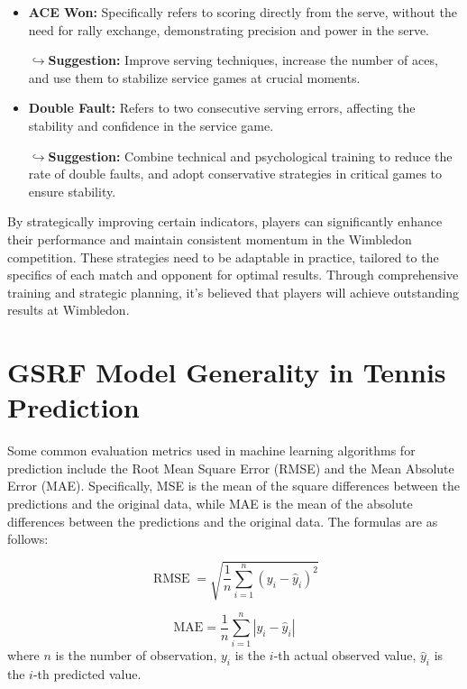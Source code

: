\documentclass[12pt]{article}%
\begin{document}
\begin{itemize}
	\item \textbf{ACE Won:} Specifically refers to scoring directly from the serve, without the need for rally exchange, demonstrating precision and power in the serve.
	
	\textbf{$\hookrightarrow$Suggestion:} Improve serving techniques, increase the number of aces, and use them to stabilize service games at crucial moments.
	
	\item \textbf{Double Fault:}  Refers to two consecutive serving errors, affecting the stability and confidence in the service game.
	
	\textbf{$\hookrightarrow$Suggestion:} Combine technical and psychological training to reduce the rate of double faults, and adopt conservative strategies in critical games to ensure stability.
	
\end{itemize}


By strategically improving certain indicators, players can significantly enhance their performance and maintain consistent momentum in the Wimbledon competition. These strategies need to be adaptable in practice, tailored to the specifics of each match and opponent for optimal results. Through comprehensive training and strategic planning, it's believed that players will achieve outstanding results at Wimbledon.



\section{GSRF Model Generality in Tennis Prediction}
Some common evaluation metrics used in machine learning algorithms for prediction include the Root Mean Square Error (RMSE) and the Mean Absolute Error (MAE). Specifically, MSE is the mean of the square differences between the predictions and the original data, while MAE is the mean of the absolute differences between the predictions and the original data. The formulas are as follows:

\begin{equation}
	\operatorname{RMSE}=\sqrt{\frac{1}{n} \sum_{i=1}^n\left(y_i-\hat{y}_i\right)^2}
\end{equation}

\begin{equation}
	\mathrm{MAE}=\frac{1}{n} \sum_{i=1}^n\left|y_i-\hat{y}_i\right|
\end{equation}
where $n$ is the number of observation, $y_i$ is the $i$-th actual observed value, $\hat{y}_i$ is the $i$-th predicted value.
\end{document}
